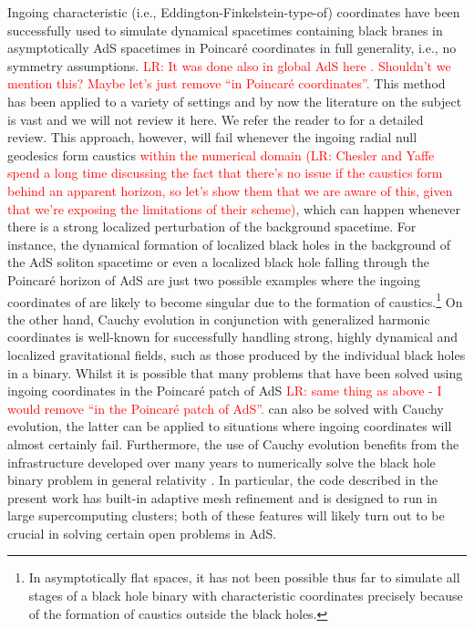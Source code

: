 \documentclass[a4paper,11pt]{article}
\numberwithin{equation}{section}
\begin{document}
Ingoing characteristic (i.e., Eddington-Finkelstein-type-of) coordinates have been successfully used to simulate dynamical spacetimes containing black branes in asymptotically AdS spacetimes in Poincar\'{e} coordinates in full generality, i.e., no symmetry assumptions. \textcolor{red}{LR: It was done also in global AdS here \cite{Chesler:2018txn}. Shouldn't we mention this? Maybe let's just remove ``in Poincar\'{e} coordinates''.} This method has been applied to a variety of settings and by now the literature on the subject is vast and we will not review it here. We refer the reader to \cite{Chesler:2013lia} for a detailed review. This approach, however, will fail whenever the ingoing radial null geodesics form caustics \textcolor{red}{within the numerical domain (LR: Chesler and Yaffe spend a long time discussing the fact that there's no issue if the caustics form behind an apparent horizon, so let's show them that we are aware of this, given that we're exposing the limitations of their scheme)}, which can happen whenever there is a strong localized perturbation of the background spacetime. For instance, the dynamical formation of localized black holes in the background of the AdS soliton spacetime \cite{Bantilan:2020pay} or even a localized black hole falling through the Poincar\'{e} horizon of AdS are just two possible examples where the ingoing coordinates of \cite{Chesler:2013lia} are likely to become singular due to the formation of caustics.\footnote{In asymptotically flat spaces, it has not been possible thus far to simulate all stages of a black hole binary with characteristic coordinates precisely because of the formation of caustics outside the black holes.} 
On the other hand, Cauchy evolution in conjunction with generalized harmonic coordinates is well-known for successfully handling strong, highly dynamical and localized gravitational fields, such as those produced by the individual black holes in a binary. 
Whilst it is possible that many problems that have been solved using ingoing coordinates in the Poincar\'{e} patch of AdS \textcolor{red}{LR: same thing as above - I would remove ``in the Poincar\'{e} patch of AdS''.} can also be solved with Cauchy evolution, the latter can be applied to situations where ingoing coordinates will almost certainly fail. Furthermore, the use of Cauchy evolution benefits from the infrastructure developed over many years to numerically solve the black hole binary problem in general relativity \cite{Pretorius:2005gq,Campanelli:2005dd,Baker:2005vv}. 
In particular, the code described in the present work has built-in adaptive mesh refinement and is designed to run in large supercomputing clusters; both of these features will likely turn out to be crucial in solving certain open problems in AdS.  
\end{document}
